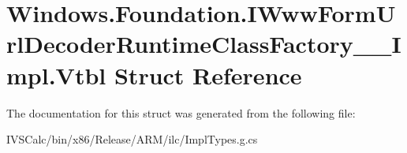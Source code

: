 \hypertarget{struct_windows_1_1_foundation_1_1_i_www_form_url_decoder_runtime_class_factory_____impl_1_1_vtbl}{}\section{Windows.\+Foundation.\+I\+Www\+Form\+Url\+Decoder\+Runtime\+Class\+Factory\+\_\+\+\_\+\+Impl.\+Vtbl Struct Reference}
\label{struct_windows_1_1_foundation_1_1_i_www_form_url_decoder_runtime_class_factory_____impl_1_1_vtbl}


The documentation for this struct was generated from the following file\+:\begin{DoxyCompactItemize}
\item 
I\+V\+S\+Calc/bin/x86/\+Release/\+A\+R\+M/ilc/Impl\+Types.\+g.\+cs\end{DoxyCompactItemize}
